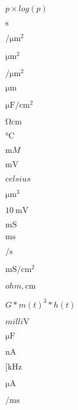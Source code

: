 \documentclass{article}
\begin{document}
$p\times log(p)$
\pagebreak

$\si{\second}$
\pagebreak

$\si{\per\micro\meter\squared}$
\pagebreak

$\si{\micro\meter\squared}$
\pagebreak

$\si{\per\micro\meter\squared} $
\pagebreak

$\si{\micro\meter}$
\pagebreak

$\si{\micro\farad\per\centi\meter\squared}$
\pagebreak

$\si{\ohm\centi\meter}$
\pagebreak

$\si{\celsius}$
\pagebreak

$\si{\milli M}$
\pagebreak

$\si{\milli\volt}$
\pagebreak

$\si{celsius}$
\pagebreak

$\si{\micro\meter\cubed}$
\pagebreak

$\SI{10}{\milli\volt}$
\pagebreak

$\si{\milli\siemens}$
\pagebreak

$\si{\milli\second}$
\pagebreak

$\si{\per\second}$
\pagebreak

$\si{\milli\siemens\per\centi\meter\squared}$
\pagebreak

$\si{ohm,\centi\meter}$
\pagebreak

$G*m(t)^3*h(t)$
\pagebreak

$\si{milli\volt}$
\pagebreak

$\si{\micro\farad}$
\pagebreak

$\si{\nano\ampere}$
\pagebreak

$[\si{\kilo\hertz}$
\pagebreak

$\si{\micro\ampere}$
\pagebreak

$\si{\per\milli\second}$
\pagebreak
\end{document}

